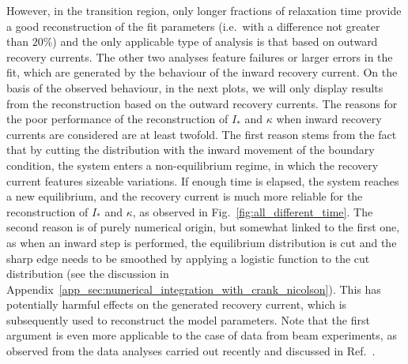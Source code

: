 However, in the transition region, only longer fractions of relaxation time provide a good reconstruction of the fit parameters  {(i.e.\ with a difference not greater than $20\%$)} and the only applicable type of analysis is that based on outward recovery currents. The other two analyses feature failures or larger errors in the fit, {which are generated by the behaviour of the inward recovery current}. On the basis of the observed behaviour, in the next plots, we will only display results from the reconstruction based on the outward recovery currents. {The reasons for the poor performance of the reconstruction of $I_\ast$ and $\kappa$ when inward recovery currents are considered are at least twofold. The first reason stems from the fact that by cutting the distribution with the inward movement of the boundary condition, the system enters a non-equilibrium regime, in which the recovery current features sizeable variations. If enough time is elapsed, the system reaches a new equilibrium, and the recovery current is much more reliable for the reconstruction of $I_\ast$ and $\kappa$, as observed in Fig.~\ref{fig:all_different_time}. The second reason is of purely numerical origin, but somewhat linked to the first one, as when an inward step is performed, the equilibrium distribution is cut and the sharp edge needs to be smoothed by applying a logistic function to the cut distribution (see the discussion in Appendix~\ref{app_sec:numerical_integration_with_crank_nicolson}). This has potentially harmful effects on the generated recovery current, which is subsequently used to reconstruct the model parameters. Note that the first argument is even more applicable to the case of data from beam experiments, as observed from the data analyses carried out recently and discussed in Ref.~\cite{montanari:ipac22-mopost043}.}

